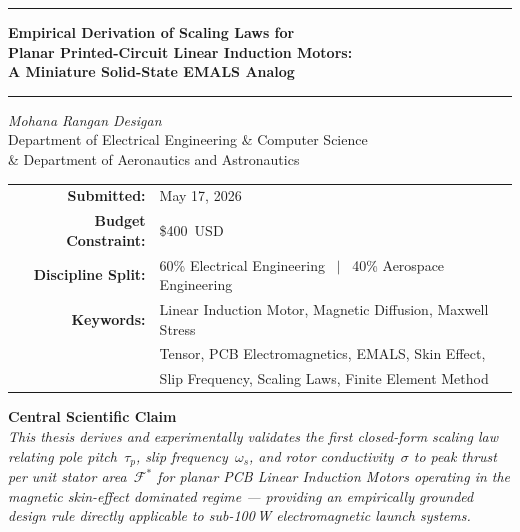 \documentclass[12pt,letterpaper]{article}
\begin{document}
\begin{titlepage}
\begin{center}
\vspace*{1cm}

{\color{mitred}\rule{\linewidth}{2pt}}
\vspace{0.4cm}

{\LARGE\bfseries Empirical Derivation of Scaling Laws for\\[6pt]
Planar Printed-Circuit Linear Induction Motors:\\[6pt]
A Miniature Solid-State EMALS Analog}

\vspace{0.4cm}
{\color{mitred}\rule{\linewidth}{2pt}}

\vspace{1.2cm}

{\large\textit{Mohana Rangan Desigan}}\\[0.4cm]
{\large Department of Electrical Engineering \& Computer Science}\\[0.2cm]
{\large \& Department of Aeronautics and Astronautics}\\[0.6cm]

\vspace{0.8cm}

\begin{tabular}{rl}
\textbf{Submitted:} & May 17, 2026 \\[4pt]
\textbf{Budget Constraint:} & \$400~USD \\[4pt]
\textbf{Discipline Split:} & 60\% Electrical Engineering ~$|$~ 40\% Aerospace Engineering \\[4pt]
\textbf{Keywords:} & Linear Induction Motor, Magnetic Diffusion, Maxwell Stress \\
                   & Tensor, PCB Electromagnetics, EMALS, Skin Effect, \\
                   & Slip Frequency, Scaling Laws, Finite Element Method \\
\end{tabular}

\vspace{1.5cm}

\begin{mdframed}[linecolor=mitred, linewidth=1pt, backgroundcolor=lightgray]
\centering
\textbf{Central Scientific Claim}\\[6pt]
\textit{This thesis derives and experimentally validates the first closed-form scaling law
relating pole pitch~$\tau_p$, slip frequency~$\omega_s$, and rotor conductivity~$\sigma$
to peak thrust per unit stator area~$\mathcal{F}^*$ for planar PCB Linear Induction Motors
operating in the magnetic skin-effect dominated regime — providing an empirically
grounded design rule directly applicable to sub-100\,W electromagnetic launch systems.}
\end{mdframed}


\end{center}
\end{titlepage}
\end{document}
